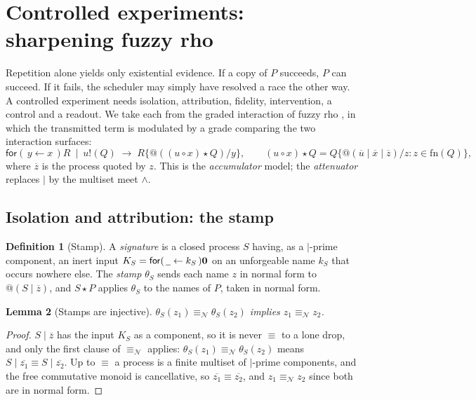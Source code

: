 \documentclass[11pt]{article}
\makeatletter
\theoremstyle{definition}
\newtheorem{definition}{Definition}[section]
\theoremstyle{plain}
\newtheorem{lemma}[definition]{Lemma}
\theoremstyle{remark}
\newcommand{\quo}[1]{@#1}
\newcommand{\dr}[1]{\overline{#1}}
\newcommand{\inp}[3]{\mathsf{for}(\,#1 \leftarrow #2\,)#3}
\newcommand{\out}[2]{#1!(#2)}
\newcommand{\nequiv}{\equiv_{\mathcal{N}}}
\newcommand{\nil}{\mathbf{0}}
\newcommand{\fn}{\mathrm{fn}}
\newcommand{\wild}{\mathord{\underline{\hspace{0.5em}}}}
\newcommand{\act}{\mathbin{\star}}
\newcommand{\cmp}{\mathbin{\circ}}
\makeatother
\begin{document}
\section{Controlled experiments: sharpening fuzzy rho}\label{sec:experiments}

Repetition alone yields only existential evidence. If a copy of $P$
succeeds, $P$ can succeed. If it fails, the scheduler may simply have
resolved a race the other way. A controlled experiment needs isolation,
attribution, fidelity, intervention, a control and a readout. We take
each from the graded interaction of fuzzy rho \cite{FuzzyRho}, in which
the transmitted term is modulated by a grade comparing the two
interaction surfaces:
\[
\inp{y}{x}{R} \ \mid\ \out{u}{Q} \;\to\; R\{\quo{((u \cmp x) \act Q)}/y\},
\qquad
(u \cmp x) \act Q = Q\{\quo{(\dr{u} \mid \dr{x} \mid \dr{z})}/z : z \in \fn(Q)\},
\]
where $\dr{z}$ is the process quoted by $z$. This is the
\emph{accumulator} model; the \emph{attenuator} replaces $\mid$ by the
multiset meet $\wedge$.

\subsection{Isolation and attribution: the stamp}

\begin{definition}[Stamp]
A \emph{signature} is a closed process $S$ having, as a $\mid$-prime
component, an inert input $K_S = \inp{\wild}{k_S}{\nil}$ on an
unforgeable name $k_S$ that occurs nowhere else. The \emph{stamp}
$\theta_S$ sends each name $z$ in normal form to $\quo{(S \mid \dr{z})}$,
and $S \act P$ applies $\theta_S$ to the names of $P$, taken in normal
form.
\end{definition}

\begin{lemma}[Stamps are injective]\label{lem:injective}
$\theta_S(z_1) \nequiv \theta_S(z_2)$ implies $z_1 \nequiv z_2$.
\end{lemma}

\begin{proof}
$S \mid \dr{z}$ has the input $K_S$ as a component, so it is never
$\equiv$ to a lone drop, and only the first clause of $\nequiv$ applies:
$\theta_S(z_1) \nequiv \theta_S(z_2)$ means $S \mid \dr{z_1} \equiv S
\mid \dr{z_2}$. Up to $\equiv$ a process is a finite multiset of
$\mid$-prime components, and the free commutative monoid is cancellative,
so $\dr{z_1} \equiv \dr{z_2}$, and $z_1 \nequiv z_2$ since both are in
normal form.
\end{proof}
\end{document}
